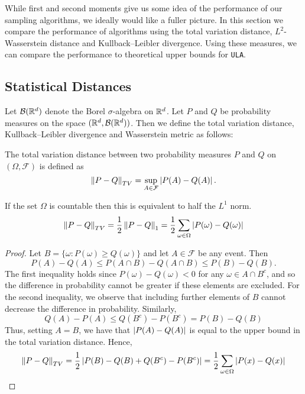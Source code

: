 While first and second moments give us some idea of the performance of our sampling algorithms, we ideally would like a fuller picture.  In this section we compare the performance of algorithms using the total variation distance, $L^2$-Wasserstein distance and Kullback--Leibler divergence.  Using these measures, we can compare the performance to theoretical upper bounds for \texttt{ULA}.

\subsection{Statistical Distances}
Let $\mathcal{B}(\mathbb{R}^d)$ denote the Borel $\sigma$-algebra on $\mathbb{R}^d$. Let $P$ and $Q$ be probability measures on the space $(\mathbb{R}^d, \mathcal{B}(\mathbb{R}^d))$.  Then we define the total variation distance, Kullback--Leibler divergence and Wasserstein metric as follows:

\begin{defn}
The total variation distance between two probability measures $P$ and $Q$ on $(\Omega, \mathcal{F})$ is defined as
$$
\norm{P - Q}_{TV} = \sup_{A \in \mathcal{F}} \abs{P(A) - Q(A)}.
$$
\end{defn}
\begin{prop}
If the set $\Omega$ is countable then this is equivalent to half the $L^1$ norm.
$$
\norm{P - Q}_{TV} = \frac{1}{2} \norm{P-Q}_1 = \frac{1}{2} \sum_{\omega \in \Omega} \abs{P(\omega) - Q(\omega)}
$$
\end{prop}
\begin{proof}
Let $B = \{\omega: P(\omega) \geq Q(\omega)\}$ and let $A \in \mathcal{F}$ be any event.  Then
$$
P(A) - Q(A) \leq P(A \cap B) - Q(A \cap B) \leq P(B) - Q(B).
$$
The first inequality holds since $P(\omega)-Q(\omega) < 0$ for any $\omega \in A \cap B^c$, and so the difference in probability cannot be greater if these elements are excluded.  For the second inequality, we observe that including further elements of $B$ cannot decrease the difference in probability.
Similarly,
$$
Q(A) - P(A) \leq Q(B^c) - P(B^c) = P(B) - Q(B)
$$
Thus, setting $A=B$, we have that $\abs{P(A)-Q(A)}$ is equal to the upper bound in the total variation distance.  Hence,
$$
\norm{P-Q}_{TV} = \frac{1}{2} \abs{P(B)-Q(B)+Q(B^c)-P(B^c)} = \frac{1}{2} \sum_{\omega \in \Omega} \abs{P(x)-Q(x)}
$$
\end{proof}


